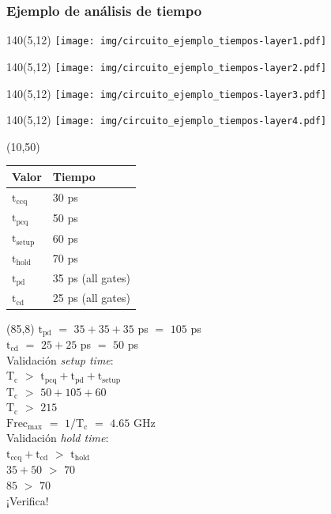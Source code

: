 \documentclass[aspectratio=169]{beamer}
\begin{document}
\begin{frame}[fragile,t]
    \frametitle{Ejemplo de análisis de tiempo}
    
    \begin{textblock}{140}(5,12) \texttt{[image: img/circuito\_ejemplo\_tiempos-layer1.pdf]} \end{textblock}
    \begin{textblock}{140}(5,12) \texttt{[image: img/circuito\_ejemplo\_tiempos-layer2.pdf]} \end{textblock}
    \begin{textblock}{140}(5,12) \texttt{[image: img/circuito\_ejemplo\_tiempos-layer3.pdf]} \end{textblock}
    \begin{textblock}{140}(5,12) \texttt{[image: img/circuito\_ejemplo\_tiempos-layer4.pdf]} \end{textblock}

    \begin{textblock}{50}(10,50)
    \begin{tabular}{l|l}
    Valor    & Tiempo \\ \hline
    $\text{t}_\text{ccq}$   & 30 ps \\
    $\text{t}_\text{pcq}$   & 50 ps \\
    $\text{t}_\text{setup}$ & 60 ps \\  
    $\text{t}_\text{hold}$  & 70 ps \\
    $\text{t}_\text{pd}$    & 35 ps (all gates) \\
    $\text{t}_\text{cd}$    & 25 ps (all gates) \\
    \end{tabular}
    \end{textblock}

    \begin{textblock}{50}(85,8)
    $\text{t}_\text{pd}$ $=$ $35 + 35 + 35$ ps $=$ $105$ ps\\
    $\text{t}_\text{cd}$ $=$ $25 + 25$ ps $=$ $50$ ps\\
    \bigskip
    Validación \emph{setup time}:\\
    {$\text{T}_\text{c}$ $>$ $\text{t}_{\text{pcq}} + \text{t}_{\text{pd}} + \text{t}_{\text{setup}}$}\\    
    {$\text{T}_\text{c}$ $>$ $50 + 105 + 60$}\\
    {$\text{T}_\text{c}$ $>$ $215$}\\
    {$\text{Frec}_\text{max}$ $=$ $1/\text{T}_\text{c}$ $=$ $4.65$ GHz}\\

    \bigskip
    Validación \emph{hold time}:\\
    {$\text{t}_{\text{ccq}} + \text{t}_{\text{cd}}$ $>$ $\text{t}_{\text{hold}}$}\\
    {$35 + 50$ $>$ $70$}\\
    {$85$ $>$ $70$}\\
    \textcolor{v}{¡Verifica!}

    \end{textblock}
\end{frame}
\end{document}
